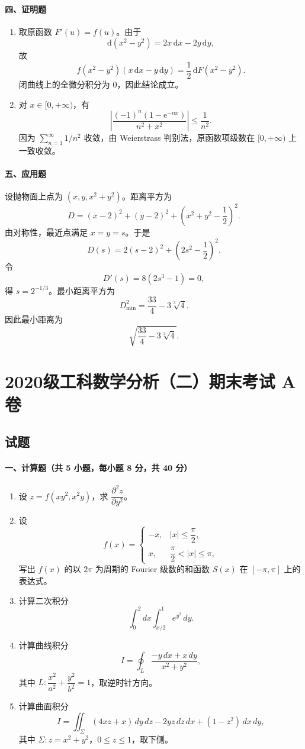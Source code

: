 \paragraph*{四、证明题}
\begin{enumerate}
  \item 取原函数 \(F'(u)=f(u)\)。由于
  \[
    \mathrm{d}(x^2-y^2)=2x\,\mathrm{d}x-2y\,\mathrm{d}y,
  \]
  故
  \[
    f(x^2-y^2)(x\,\mathrm{d}x-y\,\mathrm{d}y)
    =\frac12\,\mathrm{d}F(x^2-y^2).
  \]
  闭曲线上的全微分积分为 \(0\)，因此结论成立。

  \item 对 \(x\in[0,+\infty)\)，有
  \[
    \left|\frac{(-1)^n(1-\mathrm{e}^{-nx})}{n^2+x^2}\right|
    \le\frac1{n^2}.
  \]
  因为 \(\sum_{n=1}^{\infty}1/n^2\) 收敛，由 Weierstrass 判别法，原函数项级数在 \([0,+\infty)\) 上一致收敛。
\end{enumerate}

\paragraph*{五、应用题}
设抛物面上点为 \((x,y,x^2+y^2)\)。距离平方为
\[
  D=(x-2)^2+(y-2)^2+\left(x^2+y^2-\frac12\right)^2.
\]
由对称性，最近点满足 \(x=y=s\)。于是
\[
  D(s)=2(s-2)^2+\left(2s^2-\frac12\right)^2.
\]
令
\[
  D'(s)=8(2s^3-1)=0,
\]
得 \(s=2^{-1/3}\)。最小距离平方为
\[
  D_{\min}^2=\frac{33}{4}-3\sqrt[3]{4}.
\]
因此最小距离为
\[
  \sqrt{\frac{33}{4}-3\sqrt[3]{4}}.
\]

\section{2020级工科数学分析（二）期末考试 A 卷}

\subsection{试题}

\paragraph*{一、计算题（共 5 小题，每小题 8 分，共 40 分）}
\begin{enumerate}
  \item 设 $z=f(xy^2,x^2y)$，求 $\dfrac{\partial^2 z}{\partial y^2}$。
  \item 设
  \[
    f(x)=
    \begin{cases}
      -x, & |x|\le \dfrac{\pi}{2},\\
      x, & \dfrac{\pi}{2}<|x|\le \pi,
    \end{cases}
  \]
  写出 $f(x)$ 的以 $2\pi$ 为周期的 Fourier 级数的和函数 $S(x)$ 在 $[-\pi,\pi]$ 上的表达式。
  \item 计算二次积分
  \[
    \int_0^2 dx\int_{x/2}^1 e^{y^2}\,dy.
  \]
  \item 计算曲线积分
  \[
    I=\oint_L\frac{-y\,dx+x\,dy}{x^2+y^2},
  \]
  其中 $L:\dfrac{x^2}{a^2}+\dfrac{y^2}{b^2}=1$，取逆时针方向。
  \item 计算曲面积分
  \[
    I=\iint_\Sigma (4xz+x)\,dy\,dz-2yz\,dz\,dx+(1-z^2)\,dx\,dy,
  \]
  其中 $\Sigma:z=x^2+y^2$，$0\le z\le 1$，取下侧。
\end{enumerate}

